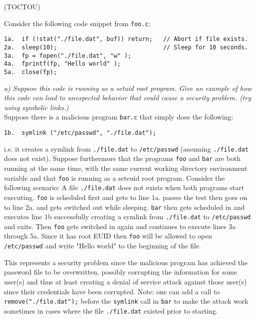 \begin{prob}  (TOCTOU) 
\end{prob}

\noindent Consider the following code snippet from \verb+foo.c+:
\begin{verbatim}
1a.  if (!stat("./file.dat", buf)) return;   // Abort if file exists.
2a.  sleep(10);                              // Sleep for 10 seconds.
3a.  fp = fopen("./file.dat", "w" );
4a.  fprintf(fp, "Hello world" );
5a.  close(fp);
\end{verbatim}
\noindent \textit{a) Suppose this code is running as a setuid root program. Give an example of how this code can lead to unexpected behavior that could cause a security problem. (try using symbolic links.)}\\

\noindent Suppose there is a malicious program \verb+bar.c+ that simply does the following:
\begin{verbatim}
1b.  symlink ("/etc/passwd", "./file.dat");
\end{verbatim}
i.e. it creates a symlink from \verb+./file.dat+ to \verb+/etc/passwd+ (assuming \verb+./file.dat+ does not exist). Suppose furthermore that the programs \verb+foo+ and \verb+bar+ are both running at the same time, with the same current working directory environment variable and that \verb+foo+ is running as a seteuid root program. Consider the following scenario: A file \verb+./file.dat+ does not exists when both programs start executing. \verb+foo+ is scheduled first and gets to line 1a. passes the test then goes on to line 2a. and gets switched out while sleeping. \verb+bar+ then gets scheduled in and executes line 1b  successfully creating a symlink from \verb+./file.dat+ to \verb+/etc/passwd+ and exits. Then \verb+foo+ gets switched in again and continues to execute lines 3a through 5a. Since it has root EUID then \verb+foo+ will be allowed to open \verb+/etc/passwd+ and write "Hello world" to the beginning of the file. 

This represents a security problem since the malicious program has achieved the password file to be overwritten, possibly corrupting the information for some user(s) and thus at least creating a denial of service attack against those user(s) since their credentials have been corrupted. Note: one can add a call to \verb+remove("./file.dat");+ before the \verb+symlink+ call in \verb+bar+ to make the attack work sometimes in cases where the file \verb+./file.dat+ existed prior to starting. \\

